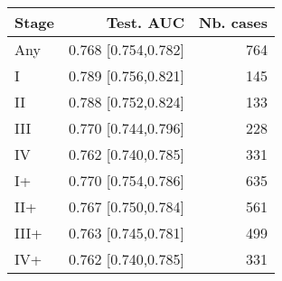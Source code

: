 \begin{table}[ht]
\centering
\begin{tabular}{lrr}
  \toprule
Stage & Test. AUC & Nb. cases \\ 
  \midrule
Any & 0.768 [0.754,0.782] & 764 \\ 
   \addlinespace
I & 0.789 [0.756,0.821] & 145 \\ 
  II & 0.788 [0.752,0.824] & 133 \\ 
  III & 0.770 [0.744,0.796] & 228 \\ 
  IV & 0.762 [0.740,0.785] & 331 \\ 
   \addlinespace
I+ & 0.770 [0.754,0.786] & 635 \\ 
  II+ & 0.767 [0.750,0.784] & 561 \\ 
  III+ & 0.763 [0.745,0.781] & 499 \\ 
  IV+ & 0.762 [0.740,0.785] & 331 \\ 
   \bottomrule
\end{tabular}
\end{table}
